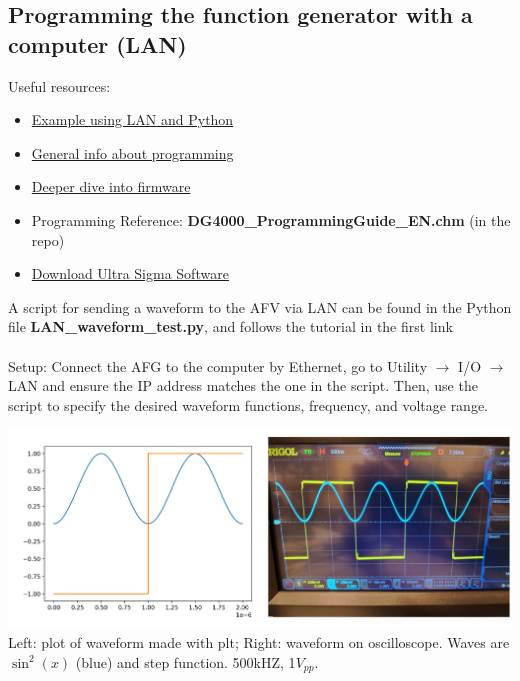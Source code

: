 \documentclass{article}
\begin{document}
    \subsection*{Programming the function generator with a computer (LAN)}
    Useful resources:
    \begin{itemize}
    \item \href{https://acidbourbon.wordpress.com/2019/09/12/send-numpy-data-to-rigol-dg4202-arbitrary-waveform-generator-via-lan/}{Example using LAN and Python}
    \item \href{https://www.eevblog.com/forum/testgear/dg4000dg4162-scpi-arbitrary-waveform-programming/}{General info about programming}
    \item \href{https://www.eevblog.com/forum/testgear/dg4000-a-firmware-investigation/}{Deeper dive into firmware}
    \item Programming Reference: \textbf{DG4000\_ProgrammingGuide\_EN.chm} (in the repo)
    \item \href{https://download.rigol.com/cn/Software/UltraSigma.zip}{Download Ultra Sigma Software}
    \end{itemize}
    A script for sending a waveform to the AFV via LAN can be found in the Python file \textbf{LAN\_waveform\_test.py}, and follows the tutorial in the first link\\\\
    Setup: Connect the AFG to the computer by Ethernet, go to Utility $\to$ I/O $\to$ LAN and ensure the IP address matches the one in the script. Then, use the script to specify the desired waveform functions, frequency, and voltage range.
    \begin{mdframed}[backgroundcolor=gray!20, align = center, userdefinedwidth = 5.8in]
    \includegraphics[width = 5.5in]{img/LAN_signal.png}
    \\Left: plot of waveform made with plt; Right: waveform on oscilloscope. Waves are $\sin^2(x)$ (blue) and step function. 500kHZ, 1$V_{pp}$.
    \end{mdframed}
\end{document}
